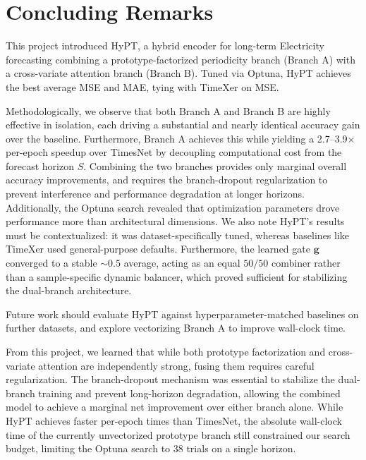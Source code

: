 \documentclass[10pt,journal]{IEEEtran}
\begin{document}
\section{Concluding Remarks}
\label{sec:conclusion}

This project introduced HyPT, a hybrid encoder for long-term Electricity forecasting combining a prototype-factorized periodicity branch (Branch A) with a cross-variate attention branch (Branch B). Tuned via Optuna, HyPT achieves the best average MSE and MAE, tying with TimeXer on MSE.

Methodologically, we observe that both Branch A and Branch B are highly effective in isolation, each driving a substantial and nearly identical accuracy gain over the baseline. Furthermore, Branch A achieves this while yielding a 2.7--3.9$\times$ per-epoch speedup over TimesNet by decoupling computational cost from the forecast horizon $S$. Combining the two branches provides only marginal overall accuracy improvements, and requires the branch-dropout regularization to prevent interference and performance degradation at longer horizons. Additionally, the Optuna search revealed that optimization parameters drove performance more than architectural dimensions. We also note HyPT's results must be contextualized: it was dataset-specifically tuned, whereas baselines like TimeXer used general-purpose defaults. Furthermore, the learned gate $\bm{g}$ converged to a stable $\sim$$0.5$ average, acting as an equal $50/50$ combiner rather than a sample-specific dynamic balancer, which proved sufficient for stabilizing the dual-branch architecture.

Future work should evaluate HyPT against hyperparameter-matched baselines on further datasets, and explore vectorizing Branch A to improve wall-clock time.

From this project, we learned that while both prototype factorization and cross-variate attention are independently strong, fusing them requires careful regularization. The branch-dropout mechanism was essential to stabilize the dual-branch training and prevent long-horizon degradation, allowing the combined model to achieve a marginal net improvement over either branch alone. While HyPT achieves faster per-epoch times than TimesNet, the absolute wall-clock time of the currently unvectorized prototype branch still constrained our search budget, limiting the Optuna search to 38 trials on a single horizon.
\end{document}
